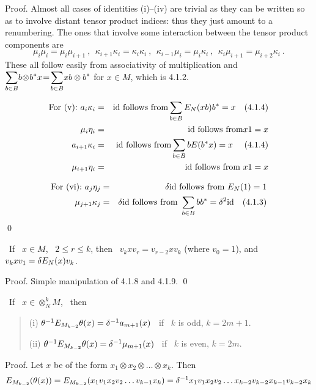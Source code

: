 \bigskip
{\sc Proof.} Almost all cases of identities (i)--(iv) are trivial
as they  can be written so as to involve distant tensor product
indices: thus they just amount to a renumbering.
The ones that involve some interaction between the tensor product
components are
$$
\mu_i\mu_i=\mu_i\mu_{i+1} \ , \ \
\kappa_{i+1}\kappa_i=\kappa_i\kappa_i \ , \ \
\kappa_{i-1}\mu_i=\mu_i\kappa_i \ , \ \
\kappa_i\mu_{i+1}=\mu_{i+2}\kappa_i \ .
$$
These all follow easily from associativity of multiplication and\\
$\displaystyle{\sum_{b\in B}\!b\!\otimes\! b^*x\!=\!\sum_{b\in B}}xb \otimes b^*$
for $x\in M$, which is 4.1.2.

\begin{eqnarray*}
{\mbox{For (v):}}\ a_i\kappa_i& = &{\bf\rm{id}}\ {\mbox{follows from}} \sum_{b\in B} E_N(xb)b^*=x \ \ \ (4.1.4)\\
\mu_i\eta_i & = & {\bf\rm{id}}\  {\mbox{follows from}}  x1=x\\
a_{i+1}\kappa_i & = & {\bf\rm{id}}\  {\mbox{follows from}} 
\sum_{b\in B} bE(b^*x)=x \ \ \ \ (4.1.4)\\
\mu_{i+1}\eta_i & = &{\bf\rm{id}}\   {\mbox{follows from}}\  x1=x
\end{eqnarray*}

\begin{eqnarray*}
{\mbox{For (vi):}}\   a_j\eta_j & = & \d{\op{id}}\   {\mbox{follows from}}\ E_N(1)=1\\
\mu_{j+1}\kappa_j&=&\d{\op{id}}\  {\mbox{follows from}}\ \sum_{b\in B} bb^*=\d^2{\op{id}} \ \ \ (4.1.3)
\end{eqnarray*}
\qed

\medskip
{} \ If \ $x\in M$, \
$2\leq r\leq k$, then \
$v_kxv_r=v_{r-2}xv_k$ (where $v_0=1$), and
$v_kxv_1=\delta E_N(x)v_k$.

\bigskip
{\sc Proof.} Simple manipulation of 4.1.8 and 4.1.9. \qed

\medskip
{} \ If \ $x\in \otimes^k_N M$, \ then \
\begin{verse}
(i)  $\theta^{-1}E_{M_{k-2}}\theta(x)=\delta^{-1}
a_{m+1}(x)$ \ if \ $k$ is odd, $k=2m+1$.

(ii) $\theta^{-1}E_{M_{k-2}}\theta(x)=\delta^{-1}\mu_{m+1}(x)$ \ if \ $k$ is even, $k=2m$.
\end{verse}

\bigskip
{\sc Proof.} Let $x$ be of the form $x_1\otimes
x_2\otimes\dots\otimes x_k$. Then
$$
E_{M_{k-2}}(\theta(x))=
E_{M_{k-2}}(x_1v_1x_2v_2\dots v_{k-1}x_k) =
\delta^{-1}x_1v_1x_2v_2\dots x_{k-2}v_{k-2}x_{k-1}v_{k-2}x_k
$$

